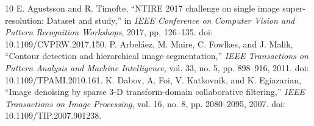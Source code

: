 \documentclass[10pt,twocolumn,journal]{IEEEtran}
\begin{document}
\begin{thebibliography}{10}
 E. Agustsson and R. Timofte, ``NTIRE 2017 challenge on single image super-resolution: Dataset and study,'' in \emph{IEEE Conference on Computer Vision and Pattern Recognition Workshops}, 2017, pp. 126--135. doi: 10.1109/CVPRW.2017.150.
 P. Arbeláez, M. Maire, C. Fowlkes, and J. Malik, ``Contour detection and hierarchical image segmentation,'' \emph{IEEE Transactions on Pattern Analysis and Machine Intelligence}, vol. 33, no. 5, pp. 898--916, 2011. doi: 10.1109/TPAMI.2010.161.
 K. Dabov, A. Foi, V. Katkovnik, and K. Egiazarian, ``Image denoising by sparse 3-D transform-domain collaborative filtering,'' \emph{IEEE Transactions on Image Processing}, vol. 16, no. 8, pp. 2080--2095, 2007. doi: 10.1109/TIP.2007.901238.
\end{thebibliography}
\end{document}
